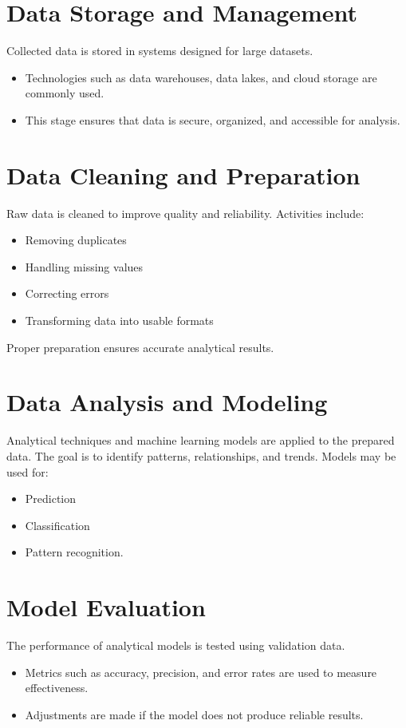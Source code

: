 \documentclass[12pt,a4paper]{article}
\begin{document}
\section{Data Storage and Management}
Collected data is stored in systems designed for large datasets.
\begin{itemize}
    \item Technologies such as data warehouses, data lakes, and cloud storage are commonly used.
    \item This stage ensures that data is secure, organized, and accessible for analysis.
\end{itemize}

\section{Data Cleaning and Preparation}
Raw data is cleaned to improve quality and reliability.
Activities include:
\begin{itemize}
    \item Removing duplicates
    \item Handling missing values
    \item Correcting errors
    \item Transforming data into usable formats
\end{itemize}
Proper preparation ensures accurate analytical results.

\section{Data Analysis and Modeling}
Analytical techniques and machine learning models are applied to the prepared data.
The goal is to identify patterns, relationships, and trends.
Models may be used for:
\begin{itemize}
    \item Prediction
    \item Classification
    \item Pattern recognition.
\end{itemize}

\section{Model Evaluation}
The performance of analytical models is tested using validation data.
\begin{itemize}
    \item Metrics such as accuracy, precision, and error rates are used to measure effectiveness.
    \item Adjustments are made if the model does not produce reliable results.
\end{itemize}
\end{document}
